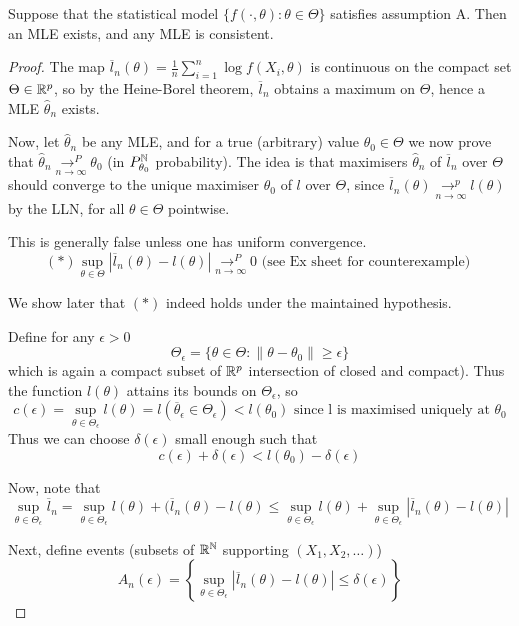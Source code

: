 \documentclass[a4paper]{article}
\begin{document}
\begin{thm}
	Suppose that the statistical model $\{f\left( \cdot , \theta \right) : \theta \in \Theta \}$ satisfies assumption A. Then an MLE exists, and any MLE is consistent.
\end{thm}

\begin{proof}
	The map $\overline{l}_n(\theta) = \frac{1}{n} \sum_{i=1}^{n} \log f(X_i, \theta)$ is continuous on the compact set $\Theta \in \mathbb{R}^{p}$, so by the Heine-Borel theorem, $\overline{l}_n$ obtains a maximum on $\Theta$, hence a MLE  $\hat{\theta}_n $ exists.

	Now, let  $\hat{\theta}_n$ be any MLE, and for a true (arbitrary) value $\theta_0 \in \Theta$ we now prove that $\hat{\theta}_n \underset{n\to \infty}{\to ^{P}} \theta_0$ (in $P_{\theta_0}^{\mathbb{N}}$ probability). The idea is that maximisers $\hat{\theta}_n$ of $\overline{l}_n$ over $\Theta$ should converge to the unique maximiser  $\theta_0$ of $l$ over $\Theta$, since  $\overline{l}_n(\theta) \underset{n\to \infty}{\to ^{p}} l(\theta)$ by the LLN, for all $\theta \in  \Theta$ pointwise.

	This is generally false unless one has uniform convergence.
	\[
		(\ast) \sup_{\theta \in \Theta} |\overline{l}_n(\theta) - l(\theta)| \underset{n\to \infty}{\to ^{P}} 0 \text{ (see Ex sheet for counterexample) }
	\] 

	We show later that $(\ast)$ indeed holds under the maintained hypothesis.

	Define for any $\epsilon > 0$ 
	\[
		\Theta_{\epsilon} = \{\theta \in  \Theta : \|\theta - \theta_0\| \ge \epsilon\} 
	\] 
	which is again a compact subset of $\mathbb{R}^{p}$ intersection of closed and compact). Thus the function $l(\theta)$ attains its bounds on  $\Theta_{\epsilon}$, so
	\[
		c(\epsilon) = \sup_{\theta \in \Theta_{\epsilon}} l(\theta) = l(\overline{\theta}_{\epsilon} \in \Theta_{\epsilon}) < l(\theta_0) \text{ since l is maximised uniquely at } \theta_0
	\] 
	Thus we can choose $\delta(\epsilon)$ small enough such that 
	 \[
	 c(\epsilon) + \delta(\epsilon) < l(\theta_0) - \delta(\epsilon) \tag{\dag}
	\]

	Now, note that  
	\[
		\sup_{\theta \in  \Theta_{\epsilon}} \overline{l}_n = \sup_{\theta \in \Theta_{\epsilon}} l(\theta) + (\overline{l}_n(\theta) - l(\theta) \le \sup_{\theta \in \Theta_{\epsilon}} l(\theta) + \sup_{\theta \in \Theta_{\epsilon}} |\overline{l}_n (\theta) - l(\theta)|
\]

	Next, define events (subsets of $\mathbb{R}^{\mathbb{N}}$ supporting $(X_1, X_2,\ldots)$) 
	\[
		A_n(\epsilon) = \left\{\sup_{\theta \in \Theta_{\epsilon}} |\overline{l}_n(\theta) - l(\theta) | \le  \delta(\epsilon)\right\} 
	\] 


\end{proof}
\end{document}

